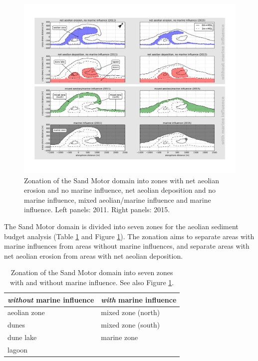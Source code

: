 \begin{figure}
  \centering
  \includegraphics[width=\columnwidth]{../Figures/decomposition}
  \caption{Zonation of the Sand Motor domain into zones with net
    aeolian erosion and no marine influence, net aeolian deposition
    and no marine influence, mixed aeolian/marine influence and marine
    influence. Left panels: 2011. Right panels: 2015.}
  \label{fig:decomposition}
\end{figure}

The Sand Motor domain is divided into seven zones for the aeolian
sediment budget analysis (Table \ref{tab:decomposition} and Figure
\ref{fig:decomposition}). The zonation aims to separate areas with
marine influences from areas without marine influences, and separate
areas with net aeolian erosion from areas with net aeolian deposition.

\begin{table}[h!]
  \centering
  \caption{Zonation of the Sand Motor domain into seven zones with and
    without marine influence. See also Figure \ref{fig:decomposition}.}
  \label{tab:decomposition}
  \begin{tabularx}{\textwidth}{XX}
    \emph{without} marine influence  & \emph{with} marine influence \\
    \hline
    aeolian zone                     & mixed zone (north)           \\
    dunes                            & mixed zone (south)           \\
    dune lake                        & marine zone                  \\
    lagoon                           &                              \\
  \end{tabularx}
\end{table}

